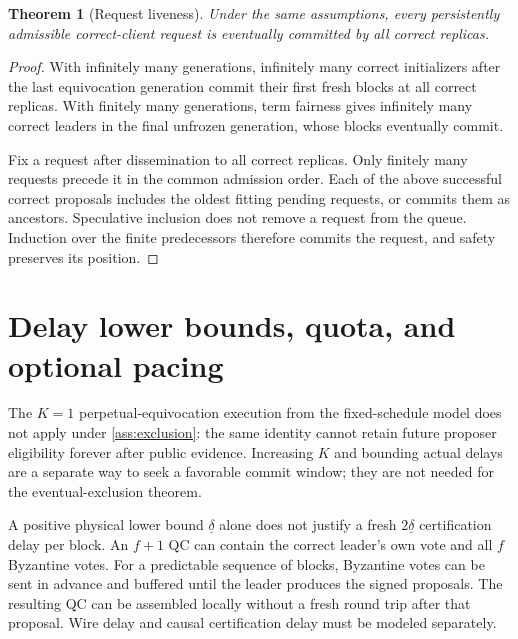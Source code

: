 \documentclass[11pt,a4paper]{article}
\newtheorem{theorem}[theorem]{Theorem}
\begin{document}
\begin{theorem}[Request liveness]
\label{thm:requests}
Under the same assumptions, every persistently admissible correct-client
request is eventually committed by all correct replicas.
\end{theorem}
\begin{proof}
With infinitely many generations, infinitely many correct initializers
after the last equivocation generation commit their first fresh blocks
at all correct replicas. With finitely many generations, term fairness
gives infinitely many correct leaders in the final unfrozen generation,
whose blocks eventually commit.

Fix a request after dissemination to all correct replicas. Only finitely
many requests precede it in the common admission order. Each of the
above successful correct proposals includes the oldest fitting pending
requests, or commits them as ancestors. Speculative inclusion does not
remove a request from the queue. Induction over the finite predecessors
therefore commits the request, and safety preserves its position.
\end{proof}

\section{Delay lower bounds, quota, and optional pacing}
\label{sec:pacing}
The $K=1$ perpetual-equivocation execution from the fixed-schedule model
does not apply under \cref{ass:exclusion}: the same identity cannot retain
future proposer eligibility forever after public evidence. Increasing
$K$ and bounding actual delays are a separate way to seek a favorable
commit window; they are not needed for the eventual-exclusion theorem.

A positive physical lower bound $\underline\delta$ alone does not justify
a fresh $2\underline\delta$ certification delay per block. An $f+1$ QC can
contain the correct leader's own vote and all $f$ Byzantine votes.
For a predictable sequence of blocks, Byzantine votes can be sent in
advance and buffered until the leader produces the signed proposals.
The resulting QC can be assembled locally without a fresh round trip
after that proposal. Wire delay and causal certification delay must be
modeled separately.
\end{document}
